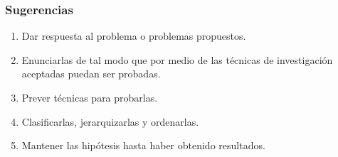 \subsubsection{Sugerencias}

\begin{enumerate}[noitemsep]
 \item Dar respuesta al problema o problemas propuestos.
 \item Enunciarlas de tal modo que por medio de las técnicas de investigación aceptadas puedan ser probadas.
 \item Prever técnicas para probarlas.
 \item Clasificarlas, jerarquizarlas y ordenarlas.
 \item Mantener las hipótesis hasta haber obtenido resultados.
\end{enumerate}

